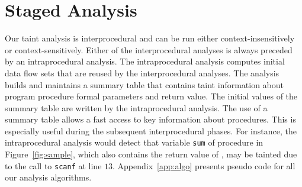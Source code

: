 \section{Staged Analysis}\label{sec:analysis}

\newcommand{\Aset}{\mathcal{A}}
\newcommand{\Pset}{\mathcal{P}}
\newcommand{\varset}{\mathit{Var}}
\newcommand{\instset}{\mathit{Inst}}
\newcommand{\procset}{\mathit{Proc}}
\newcommand{\formalsset}{\mathit{formals}}
\newcommand{\firstfunc}{\mathit{first}}
\newcommand{\toplevelfunc}{\mathit{toplevel}}
\newcommand{\pointsto}[2]{{pt}_{[#1]}(#2)}
\newcommand{\pointstobefore}[2]{{pt}_{[\overline{#1}]	}(#2)}
\newcommand{\pointstoafter}[2]{{pt}_{[\underline{#1}]}(#2)}

\newcommand{\myinflow}{\mathit{IN}}
\newcommand{\myoutflow}{\mathit{OUT}}
\newcommand{\ifff}{\mathit{iff}}
\newcommand{\aand}{\mathit{and}}
\newcommand{\mybigcup}[2]{\mathlarger{\bigcup_{#1}^{#2}}}

\newcommand{\copydef}{$\text{COPY}\ [p = q]$}
\newcommand{\loaddef}{$\text{LOAD}\ [p = *q]$}
\newcommand{\addrofdef}{$\text{ADDROF}\ [p = \&a]$}
\newcommand{\storedef}{$\text{STORE}\ [*p = q]$}
\newcommand{\sourcedef}{\text{SOURCE}\ [r = \text{call}\ \text{func}(a_0, a_1, ..., a_n)]}
\newcommand{\calldef}{\text{CALL} [r = \text{call}\ \text{func}(a_0, a_1, ..., a_n)]}
\newcommand{\callinsdef}{\text{CALL-INS} [r = \text{call}\ \text{func}(a_0, a_1, ..., a_n)]}
\newcommand{\sinkdef}{\text{SINK} [r = \text{call}\ \text{func}]}

Our taint analysis is interprocedural and can be run
either context-insensitively or context-sensitively.
Either of the interprocedural analyses is always preceded
by an intraprocedural analysis. The intraprocedural analysis
computes initial data flow sets that are reused by the
interprocedural analyses.
The analysis builds and maintains a summary table that contains
taint information about program procedure formal parameters
and return value.
The initial values of the summary table are written by
the intraprocedural analysis. The use of a summary table
allows a fast access to key information about procedures.
This is especially useful during the subsequent interprocedural
phases.
For instance, the intraprocedural analysis would
detect that variable \texttt{sum} of procedure \compute{} in
Figure~\ref{fig:sample}, which also contains the return
value of \compute{}, may be tainted due to the call
to \texttt{scanf} at line $13$.
Appendix~\ref{app:algo} presents pseudo code for all
our analysis algorithms.

